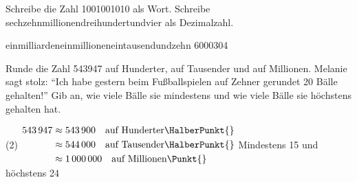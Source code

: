 
\begin{Aufgabe}{3}
	\begin{tasks}
		\task Schreibe die Zahl \num{1001001010} als Wort.
		\task Schreibe sechzehnmillionendreihundertundvier als Dezimalzahl.
	\end{tasks}
\end{Aufgabe}
\begin{Loesung}
	\begin{tasks}
		\task einmilliardeneinmillioneneintausendundzehn \Punkt{}
		\task \num{6000304} \Punkt
	\end{tasks}
\end{Loesung}
\begin{Aufgabe}{3}
	\begin{tasks}
		\task Runde die Zahl \num{543947}{} auf Hunderter, auf Tausender und auf Millionen.
		\task Melanie sagt stolz: "`Ich habe gestern beim Fußballspielen auf Zehner gerundet 20 Bälle gehalten!"'
		Gib an, wie viele Bälle sie mindestens und wie viele Bälle sie höchstens gehalten hat.
	\end{tasks}
\end{Aufgabe}
\begin{Loesung}
	\begin{tasks}(2)
		\task $
		\begin{aligned}
			\num{543947}
			&\approx \num{543900}\quad\text{auf Hunderter}\HalberPunkt{}\\
			&\approx \num{544000}\quad\text{auf Tausender}\HalberPunkt{}\\
			&\approx \num{1000000}\quad\text{auf Millionen}\Punkt{}\\
		\end{aligned}
		$
		\task Mindestens 15 \HalberPunkt{} und höchstens 24 \HalberPunkt{}
	\end{tasks}
\end{Loesung}


